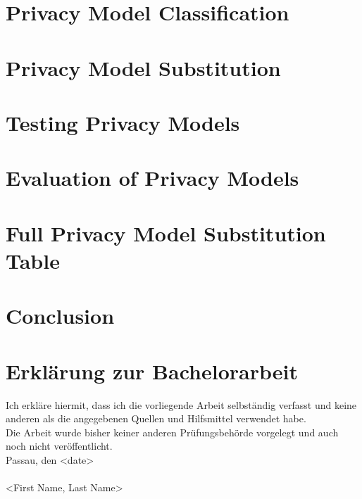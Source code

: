 \documentclass[12pt, a4paper,oneside]{report}
\begin{document}
\chapter{Privacy Model Classification}

\chapter{Privacy Model Substitution}

\chapter{Testing Privacy Models}

\chapter{Evaluation of Privacy Models}

\chapter{Full Privacy Model Substitution Table}

\chapter{Conclusion}










\newpage
\chapter*{Erklärung zur Bachelorarbeit}
Ich erkläre hiermit, dass ich die vorliegende Arbeit selbständig verfasst und keine anderen als die angegebenen Quellen und Hilfsmittel verwendet habe. \newline
\ \\
Die Arbeit wurde bisher keiner anderen Prüfungsbehörde vorgelegt und auch noch nicht veröffentlicht.\newline
\ \\
Passau, den <date>
\newline
\ \\
\ \\
<First Name, Last Name>
\end{document}
